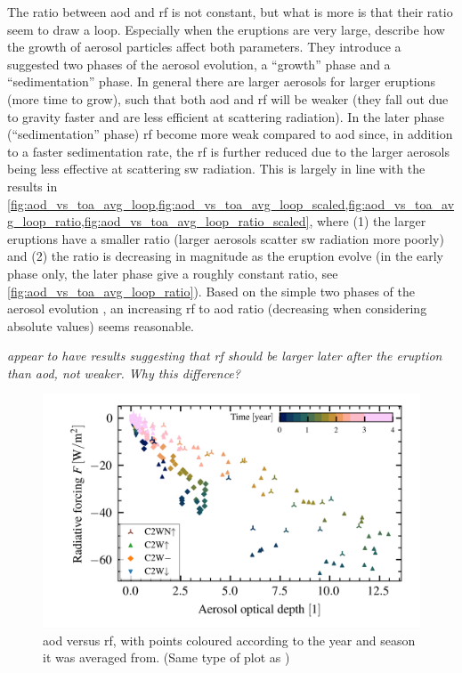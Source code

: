 \documentclass[twocol]{ametsocV5}
\begin{document}

The ratio between \acrshort{aod} and \acrshort{rf} is not constant, but what is more is
that their ratio seem to draw a loop. Especially when the eruptions are very large,
\citet[][see their sections 3.1.2, 3.2.2]{marshall2019} describe how the growth of
aerosol particles affect both parameters. They introduce a suggested two phases of the
aerosol evolution, a ``growth'' phase and a ``sedimentation'' phase. In general there
are larger aerosols for larger eruptions (more time to grow), such that both
\acrshort{aod} and \acrshort{rf} will be weaker (they fall out due to gravity faster and
are less efficient at scattering radiation). In the later phase (``sedimentation''
phase) \acrshort{rf} become more weak compared to \acrshort{aod} since, in addition to a
faster sedimentation rate, the \acrshort{rf} is further reduced due to the larger
aerosols being less effective at scattering \acrshort{sw} radiation. This is largely in
line with the results in
\cref{fig:aod_vs_toa_avg_loop,fig:aod_vs_toa_avg_loop_scaled,fig:aod_vs_toa_avg_loop_ratio,fig:aod_vs_toa_avg_loop_ratio_scaled},
where (1) the larger eruptions have a smaller ratio (larger aerosols scatter
\acrshort{sw} radiation more poorly) and (2) the ratio is decreasing in magnitude as the
eruption evolve (in the early phase only, the later phase give a roughly constant ratio,
see \cref{fig:aod_vs_toa_avg_loop_ratio}). Based on the simple two phases of the aerosol
evolution \citep{marshall2019}, an increasing \acrshort{rf} to \acrshort{aod} ratio
(decreasing when considering absolute values) seems reasonable.

\emph{\citet[][their figure 1c,d]{marshall2020} appear to have results suggesting that
  \acrshort{rf} should be larger later after the eruption than \acrshort{aod}, not weaker.
  Why this difference?}

\begin{figure}[t]
  \begin{center}
    \includegraphics[width=0.95\linewidth]{figures/aod_vs_toa_avg_loop.png}
  \end{center}
  \caption{
    \acrshort{aod} versus \acrshort{rf}, with points coloured according to the year and
    season it was averaged from. (Same type of plot as \citet{gregory2016})
  }%
  \label{fig:aod_vs_toa_avg_loop}
\end{figure}
\end{document}
